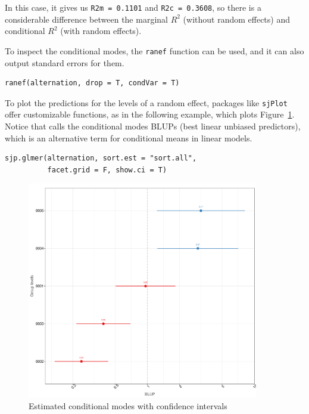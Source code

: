 \documentclass[a4paper,12pt]{article}
\begin{document}
In this case, it gives us \texttt{R2m = 0.1101} and \texttt{R2c = 0.3608}, so there is a considerable difference between the marginal $R^2$ (without random effects) and conditional $R^2$ (with random effects).

To inspect the conditional modes, the \texttt{ranef} function can be used, and it can also output standard errors for them.

\vspace{0.5\baselineskip}

\begin{lstlisting}[frame=trbl]
ranef(alternation, drop = T, condVar = T)
\end{lstlisting}

To plot the predictions for the levels of a random effect, packages like \texttt{sjPlot} offer customizable functions, as in the following example, which plots Figure~\ref{fig:blups}.
Notice that calls the conditional modes BLUPs (best linear unbiased predictors), which is an alternative term for conditional means in linear models.

\vspace{0.5\baselineskip}

\begin{lstlisting}[frame=trbl]
sjp.glmer(alternation, sort.est = "sort.all",
          facet.grid = F, show.ci = T)
\end{lstlisting}

\begin{figure}[!htpb]
  \centering
  \includegraphics[width=0.9\textwidth]{graphics/blups}
  \caption{Estimated conditional modes with confidence intervals}
  \label{fig:blups}
\end{figure}
\end{document}
